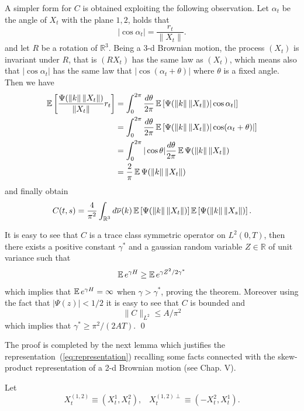 A simpler form for $C$ is obtained exploiting the following observation. 
Let $\alpha_t$ be the angle of $X_t$ with the plane $1,2$, holds that
$$
|\cos \alpha_t| = \frac{r_t}{\|X_t\|}.
$$ 
and let $R$ be a rotation of $\mathbb{R}^3$. 
Being a 3-d Brownian motion, the process $(X_t)$ is invariant under $R$, that
is $( R X_t )$ has the same law as $( X_t )$, which means also that
$|\cos \alpha_t|$ has the same law that  $|\cos (\alpha_t + \theta)|$ where
$\theta$ is a fixed angle. Then we have
\begin{equation}
\begin{split}
\operatorname{{\mathbb E}} \left[  \frac{\Psi(\|k\|\,\|X_t\|)}{\|X_t\|} r_t
\right] 
& = \int_0^{2\pi} \frac{d\theta}{2\pi} \operatorname{{\mathbb E}} \left[ \Psi(\|k\|\,\|X_t\|) |\cos \alpha_t| \right] \\
& =  \int_0^{2\pi} \frac{d\theta}{2\pi} \operatorname{{\mathbb E}} \left[ \Psi(\|k\|\,\|X_t\|)
  |\cos (\alpha_t + \theta)| \right] \\
& = 
\int_0^{2\pi} |\cos \theta| \frac{d\theta}{2 \pi}  
\operatorname{{\mathbb E}} \Psi(\|k\|\,\|X_t\|)   \\
& =  \frac{2}{\pi} \operatorname{{\mathbb E}} \Psi(\|k\|\,\|X_t\|) \\
\end{split}
\end{equation}
and finally obtain
$$
C(t,s) =  \frac{4 }{\pi^2} \int_{\mathbb{R}^3} d\overline{\nu}(k)
 \operatorname{{\mathbb E}} \left[ \Psi(\|k\|\,\|X_t\|)
 \right] \operatorname{{\mathbb E}} \left[ \Psi(\|k\|\,\|X_s\|) \right].
$$

It is easy to see that $C$ is a trace class symmetric operator on
$L^2(0,T)$, then there exists a positive constant $\gamma^*$ and a
gaussian random variable $Z \in \mathbb{R}$ of unit variance such that
$$
\operatorname{{\mathbb E}} e^{\gamma H} \ge  \operatorname{{\mathbb E}} e^{\gamma Z^2/2\gamma^*}
$$ 
which implies that 
$\operatorname{{\mathbb E}} e^{\gamma H} =  \infty$ 
when $\gamma > \gamma^*$, proving the theorem. Moreover using the fact that
$|\Psi(z)| < 1/2$ it is easy to see that $C$ is bounded and 
$$
\|C\|_{L^2} \le A /\pi^2
$$
which implies that $\gamma^* \ge \pi^2/(2AT)$. \qed

The proof is completed by the next lemma which justifies the
representation~(\ref{eq:representation}) recalling some facts connected with 
the skew-product representation of a 2-d Brownian motion (see \cite{R-Y} Chap. V).


Let 
\begin{equation*}
X_{t}^{\left( 1,2\right) } \equiv \left( X_{t}^{1},X_{t}^{2}\right)
,\,\,\,\,\,X_{t}^{\left( 1,2\right) \perp } \equiv \left(
-X_{t}^{2},X_{t}^{1}\right) .
\end{equation*}

